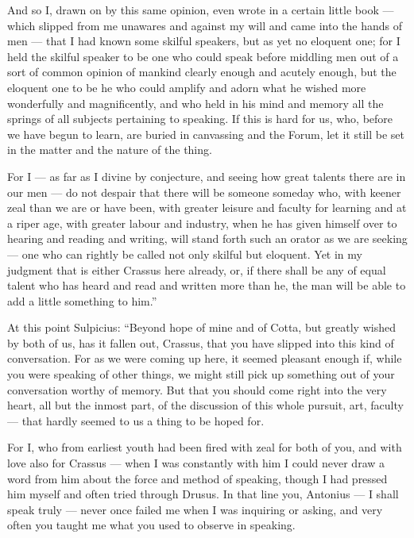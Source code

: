  And so I, drawn on by this same opinion, even wrote in a certain little book — which slipped from me unawares and against my will and came into the hands of men — that I had known some skilful speakers, but as yet no eloquent one; for I held the skilful speaker to be one who could speak before middling men out of a sort of common opinion of mankind clearly enough and acutely enough, but the eloquent one to be he who could amplify and adorn what he wished more wonderfully and magnificently, and who held in his mind and memory all the springs of all subjects pertaining to speaking. If this is hard for us, who, before we have begun to learn, are buried in canvassing and the Forum, let it still be set in the matter and the nature of the thing.

 For I — as far as I divine by conjecture, and seeing how great talents there are in our men — do not despair that there will be someone someday who, with keener zeal than we are or have been, with greater leisure and faculty for learning and at a riper age, with greater labour and industry, when he has given himself over to hearing and reading and writing, will stand forth such an orator as we are seeking — one who can rightly be called not only skilful but eloquent. Yet in my judgment that is either Crassus here already, or, if there shall be any of equal talent who has heard and read and written more than he, the man will be able to add a little something to him.''

 At this point Sulpicius: ``Beyond hope of mine and of Cotta, but greatly wished by both of us, has it fallen out, Crassus, that you have slipped into this kind of conversation. For as we were coming up here, it seemed pleasant enough if, while you were speaking of other things, we might still pick up something out of your conversation worthy of memory. But that you should come right into the very heart, all but the inmost part, of the discussion of this whole pursuit, art, faculty — that hardly seemed to us a thing to be hoped for.

 For I, who from earliest youth had been fired with zeal for both of you, and with love also for Crassus — when I was constantly with him I could never draw a word from him about the force and method of speaking, though I had pressed him myself and often tried through Drusus. In that line you, Antonius — I shall speak truly — never once failed me when I was inquiring or asking, and very often you taught me what you used to observe in speaking.

